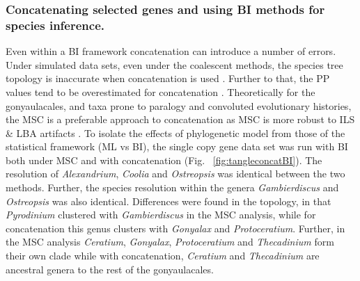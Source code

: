 \documentclass[12pt]{article}
\begin{document}
\subsubsection*{Concatenating selected genes and using BI methods for species inference.}
\FloatBarrier
Even within a BI framework concatenation can introduce a number of errors. 
Under simulated data sets, even under the coalescent methods, the species tree topology is inaccurate when concatenation is used \cite{kubatko2007inconsistency}. 
Further to that, the PP values tend to be overestimated for concatenation \cite{suzuki2002overcredibility}. 
Theoretically for the gonyaulacales, and taxa prone to paralogy and convoluted evolutionary histories, the MSC is a preferable approach to concatenation as MSC is more robust to ILS \& LBA artifacts \cite{liu2014coalescent}. 
To isolate the effects of phylogenetic model from those of the statistical framework (ML vs BI), the single copy gene data set was run with BI both under MSC and with concatenation (Fig. ~\ref{fig:tangleconcatBI}). 
The resolution of \textit{Alexandrium}, \textit{Coolia} and \textit{Ostreopsis} was identical between the two methods. 
Further, the species resolution within the genera \textit{Gambierdiscus} and \textit{Ostreopsis} was also identical. 
Differences were found in the topology, in that \textit{Pyrodinium} clustered with \textit{Gambierdiscus} in the MSC analysis, while for concatenation this genus clusters with \textit{Gonyalax} and \textit{Protoceratium}. 
Further, in the MSC analysis \textit{Ceratium}, \textit{Gonyalax}, \textit{Protoceratium} and \textit{Thecadinium} form their own clade while with concatenation, \textit{Ceratium} and \textit{Thecadinium} are ancestral genera to the rest of the gonyaulacales. 
\end{document}
